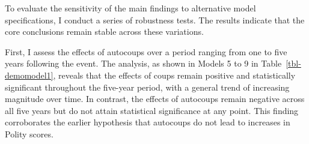 \documentclass[
  12pt,
]{report}
\begin{document}
To evaluate the sensitivity of the main findings to alternative model
specifications, I conduct a series of robustness tests. The results
indicate that the core conclusions remain stable across these
variations.

First, I assess the effects of autocoups over a period ranging from one
to five years following the event. The analysis, as shown in Models 5 to
9 in Table~\ref{tbl-demomodel1}, reveals that the effects of coups
remain positive and statistically significant throughout the five-year
period, with a general trend of increasing magnitude over time. In
contrast, the effects of autocoups remain negative across all five years
but do not attain statistical significance at any point. This finding
corroborates the earlier hypothesis that autocoups do not lead to
increases in Polity scores.
\end{document}

